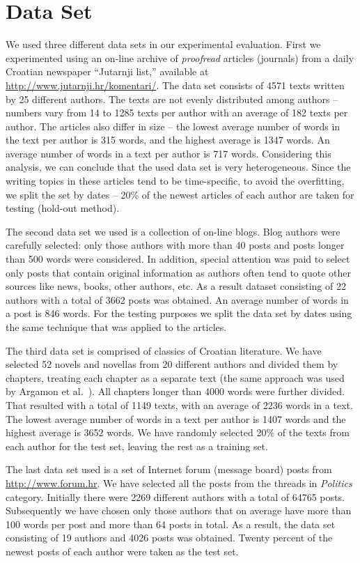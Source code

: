 \documentclass{llncs}
\begin{document}
\section{Data Set}
\label{sec:podatci}
We used three different data sets in our experimental evaluation. First we
experimented using an on-line archive of \emph{proofread} articles (journals)
from a daily Croatian newspaper ``Jutarnji list,'' available at
\small \url{http://www.jutarnji.hr/komentari/}\normalsize.  The data set consists of 4571 texts
written by 25 different authors. The texts are not evenly distributed among
authors -- numbers vary from 14 to 1285 texts per author with an average of 182
texts per author. The articles also differ in size -- the lowest average number
of words in the text per author is 315 words, and the highest average is 1347
words. An average number of words in a text per author is 717 words. Considering
this analysis, we can conclude that the used data set is very heterogeneous.
Since the writing topics in these articles tend to be time-specific, to avoid the
overfitting, we split the set by dates -- 20\% of the newest articles of each
author are taken for testing (hold-out method).

The second data set we used is a collection of on-line blogs. Blog authors were
carefully selected: only those authors with more than 40 posts
and posts longer than 500 words were considered. In addition, special attention
was paid to select only posts that contain original information as authors often tend to
quote other sources like news, books, other authors, etc. As a result dataset
consisting of 22 authors with a total of 3662 posts was obtained. An
average number of words in a post is 846 words. For the testing purposes we
split the data set by dates using the same technique that was applied to the
articles.

The third data set is comprised of classics of Croatian literature. We have
selected 52 novels and novellas from 20 different authors and divided them by
chapters, treating each chapter as a separate text (the same approach was used by
Argamon et al.\ \cite{argamon2005measuring}). All chapters longer than 4000 words
were further divided. That resulted with a total of 1149 texts, with an average
of 2236 words in a text. The lowest average number of words in a text per
author is 1407 words and the highest average is 3652 words. We have randomly 
selected 20\% of the texts from each author for the test set, leaving the rest as
a training set.

The last data set used is a set of Internet forum (message board)
posts from \small \url{http://www.forum.hr}\normalsize. We have selected all the posts from the threads in
\textit{Politics} category. Initially there were 2269 different authors with a
total of 64765 posts. Subsequently we have chosen only those authors that on
average have more than 100 words per post and more than 64 posts in total. As a
result, the data set consisting of 19 authors and 4026 posts was obtained. Twenty
percent of the newest posts of each author were taken as the test set.
\end{document}
